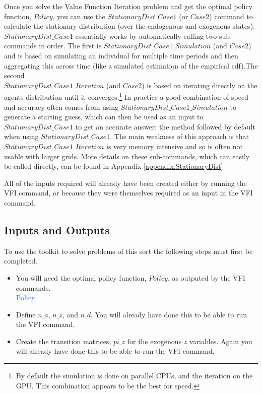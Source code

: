Once you solve the Value Function Iteration problem and get the optimal policy function, $Policy$, you can use the $StationaryDist\_{}Case1$ (or $Case2$) command
to calculate the stationary distribution (over the endogenous and exogenous states). $StationaryDist\_{}Case1$ essentially works by automatically calling two
sub-commands in order.
The first is $StationaryDist\_{}Case1\_{}Simulation$ (and $Case2$) and is based on simulating an individual for
multiple time periods and then aggregating this across time (like a simulated estimation of the empirical cdf).The second \\ $StationaryDist\_{}Case1\_{}Iteration$ (and $Case2$)
is based on iterating directly on the agents distribution until it converges.\footnote{By default the simulation is done on parallel CPUs, and the iteration on the GPU. This combination
appears to be the best for speed.} In practice a good combination of speed and accuracy often comes from
using $StationaryDist\_{}Case1\_{}Simulation$ to generate a starting guess, which can then be used as an input to $StationaryDist\_{}Case1$ to get an accurate answer;
the method followed by default when using $StationaryDist\_{}Case1$. The main weakness of this approach is that \\ $StationaryDist\_{}Case1\_{}Iteration$ is very memory intensive and so is
often not usable with larger grids. More details on these sub-commands, which can easily be called directly, can be found in Appendix \ref{appendix:StationaryDist}

All of the inputs required will already have been created either by running the VFI command, or because they were themselves required as an
input in the VFI command.

\subsection{Inputs and Outputs}
To use the toolkit to solve problems of this sort the following steps must first be completed.
\begin{itemize}
 \item You will need the optimal policy function, $Policy$, as outputed by the VFI commands. \\
    \textcolor{RoyalBlue}{Policy}
 \item Define $n\_{}a$, $n\_{}z$, and $n\_{}d$. You will already have done this to be able to run the VFI command.
 \item Create the transition matrices, $pi\_{}z$ for the exogenous $z$ variables. Again you will already have done this to be able to run the VFI command.
\end{itemize}

